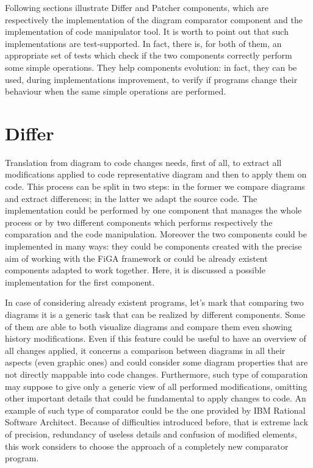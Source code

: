 Following sections illustrate Differ and Patcher components, which are respectively the implementation of the diagram comparator component and the implementation of code manipulator tool.
It is worth to point out that such implementations are test-supported. In fact, there is, for both of them, an appropriate set of tests which check if the two components correctly perform some simple operations. They help components evolution: in fact, they can be used, during implementations improvement, to verify if programs change their behaviour when the same simple operations are performed.

\section{Differ}
Translation from diagram to code changes needs, first of all, to extract all modifications applied to code representative diagram and then to apply them on code. This process can be split in two steps: in the former we compare diagrams and extract differences; in the latter we adapt the source code. The implementation could be performed by one component that manages the whole process or by two different components which performs respectively the comparation and the code manipulation.
Moreover the two components could be implemented in many ways: they could be components created with the precise aim of working with the FiGA framework or could be already existent components adapted to work together.
Here, it is discussed a possible implementation for the first component.

In case of considering already existent programs, let's mark that comparing two diagrams it is a generic task that can be realized by different components. Some of them are able to both visualize diagrams and compare them even showing history modifications. Even if this feature could be useful to have an overview of all changes applied, it concerns a comparison between diagrams in all their aspects (even graphic ones) and could consider some diagram properties that are not directly mappable into code changes. Furthermore, such type of comparation may suppose to give only a generic view of all performed modifications, omitting other important details that could be fundamental to apply changes to code. An example of such type of comparator could be the one provided by IBM Rational Software Architect. Because of difficulties introduced before, that is extreme lack of precision, redundancy of useless details and confusion of modified elements, this work considers to choose the approach of a completely new comparator program.


